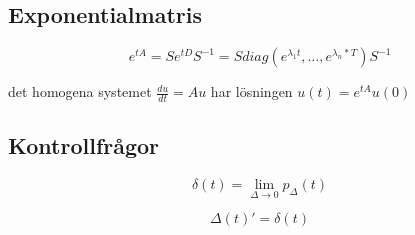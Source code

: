 \documentclass[twocolumn,a4paper]{article}
\begin{document}
\subsection*{Exponentialmatris}
\begin{equation}
    e^{tA} = Se^{tD}S^{-1} = S diag(e^{\lambda_1t}, \ldots, e^{\lambda_n * T}) S^{-1}
\end{equation}

det homogena systemet $\frac{du}{dt}=Au$ har lösningen $u(t)=e^{tA}u(0)$


\subsection*{Kontrollfrågor}
\begin{equation}
    \delta(t) = \lim_{\Delta \to 0} p_{\Delta}(t)
\end{equation}

\begin{equation}
    \Delta(t)' = \delta(t)
\end{equation}
\end{document}
